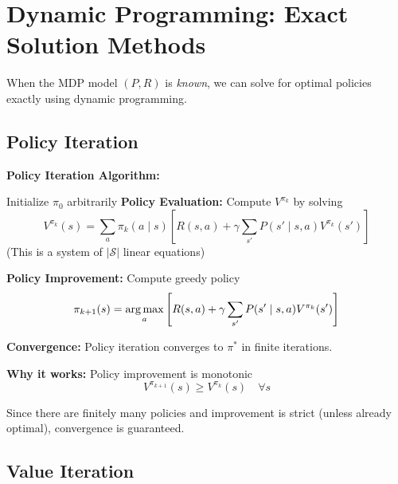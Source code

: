 \section{Dynamic Programming: Exact Solution Methods}

When the MDP model $(P, R)$ is \textit{known}, we can solve for optimal policies exactly using dynamic programming.

\subsection{Policy Iteration}

\begin{seanbox}{5.3}
\textbf{Policy Iteration Algorithm:}

\begin{algorithmic}[1]
\State Initialize $\pi_0$ arbitrarily
    \State \textbf{Policy Evaluation:} Compute $V^{\pi_k}$ by solving
    \begin{equation}
        V^{\pi_k}(s) = \sum_a \pi_k(a \mid s) \left[ R(s,a) + \gamma \sum_{s'} P(s' \mid s, a) V^{\pi_k}(s') \right]
    \end{equation}
    (This is a system of $|\mathcal{S}|$ linear equations)
    
    \State \textbf{Policy Improvement:} Compute greedy policy
    \begin{equation}
        \pi_{k+1}(s) = \operatorname*{arg\,max}_a \left[ R(s,a) + \gamma \sum_{s'} P(s' \mid s, a) V^{\pi_k}(s') \right]
    \end{equation}
\EndFor
\end{algorithmic}

\textbf{Convergence:} Policy iteration converges to $\pi^*$ in finite iterations.

\textbf{Why it works:} Policy improvement is monotonic
\begin{equation}
    V^{\pi_{k+1}}(s) \geq V^{\pi_k}(s) \quad \forall s
\end{equation}

Since there are finitely many policies and improvement is strict (unless already optimal), convergence is guaranteed.
\end{seanbox}

\subsection{Value Iteration}

